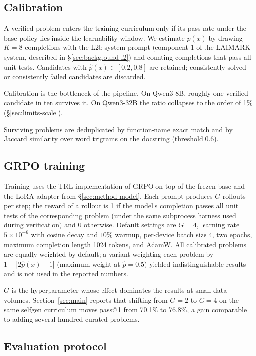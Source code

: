 \documentclass[11pt,a4paper]{article}
\begin{document}
\subsection{Calibration}
\label{sec:method-calib}

A verified problem enters the training curriculum only if its pass rate under the base policy lies inside the learnability window.
We estimate $p(x)$ by drawing $K = 8$ completions with the L2b system prompt (component 1 of the LAIMARK system, described in \S\ref{sec:background-l2}) and counting completions that pass all unit tests.
Candidates with $\hat{p}(x) \in [0.2, 0.8]$ are retained; consistently solved or consistently failed candidates are discarded.

Calibration is the bottleneck of the pipeline.
On Qwen3-8B, roughly one verified candidate in ten survives it.
On Qwen3-32B the ratio collapses to the order of 1\% (\S\ref{sec:limits-scale}).

Surviving problems are deduplicated by function-name exact match and by Jaccard similarity over word trigrams on the docstring (threshold 0.6).

\subsection{GRPO training}
\label{sec:method-grpo}

Training uses the TRL implementation of GRPO on top of the frozen base and the LoRA adapter from \S\ref{sec:method-model}.
Each prompt produces $G$ rollouts per step; the reward of a rollout is 1 if the model's completion passes all unit tests of the corresponding problem (under the same subprocess harness used during verification) and 0 otherwise.
Default settings are $G = 4$, learning rate $5 \times 10^{-6}$ with cosine decay and $10\%$ warmup, per-device batch size 4, two epochs, maximum completion length 1024 tokens, and AdamW.
All calibrated problems are equally weighted by default; a variant weighting each problem by $1 - |2\hat{p}(x) - 1|$ (maximum weight at $\hat{p} = 0.5$) yielded indistinguishable results and is not used in the reported numbers.

$G$ is the hyperparameter whose effect dominates the results at small data volumes.
Section~\ref{sec:main} reports that shifting from $G = 2$ to $G = 4$ on the same selfgen curriculum moves pass@1 from 70.1\% to 76.8\%, a gain comparable to adding several hundred curated problems.

\subsection{Evaluation protocol}
\label{sec:method-eval}
\end{document}
